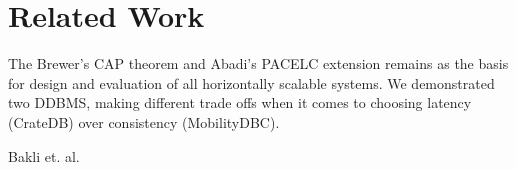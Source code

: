 \section{Related Work}
\label{cha:relatedwork}

The Brewer's \cite{brewerRobustDistributedSystems2000} CAP theorem and Abadi's \cite{abadiConsistencyTradeoffsModern2012} PACELC extension remains as the basis for design and evaluation of all horizontally scalable systems.
We demonstrated two DDBMS, making different trade offs when it comes to choosing latency (CrateDB) over consistency (MobilityDBC).

Bakli et. al.\parencite{bakliDistributedMobilityData2020, bakliDistributedMovingObject2019, cubukcuCitusDistributedPostgreSQL2021}


